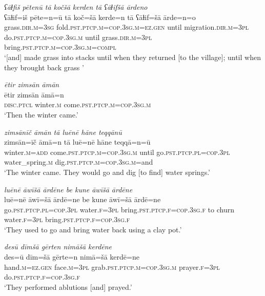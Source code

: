 \ea \label{ŽE.13}
\textit{ʕāɫfiš pētenū tā kočšā kerden tā ʕāɫifšā ārdeno} \\ 
\gll ʕāɫif=iš pēte=n=ū tā koč=šā kerde=n tā ʕāɫif=šā ārde=n=o \\ 
 grass\textsc{.dir}\textsc{.m}\textsc{=3sg} fold\textsc{.pst}\textsc{.ptcp}\textsc{.m}\textsc{=cop}\textsc{.3sg}\textsc{.m}\textsc{\textsc{=ez.gen}} until migration\textsc{.dir}\textsc{.m}\textsc{=3pl} do\textsc{.pst}\textsc{.ptcp}\textsc{.m}\textsc{=cop}\textsc{.3sg}\textsc{.m} until grass\textsc{.dir}\textsc{.m}\textsc{=3pl} bring\textsc{.pst}\textsc{.ptcp}\textsc{.m}\textsc{=cop}\textsc{.3sg}\textsc{.m}\textsc{=compl} \\ 
\glt `[and] made grass into stacks until when they returned [to the village]; until when they brought back grass '
\z 
 
\ea \label{ŽE.14}
\textit{ētir zimsān āmān} \\ 
\gll ētir zimsān āmā=n \\ 
 \textsc{disc.ptcl} winter\textsc{.m} come\textsc{.pst}\textsc{.ptcp}\textsc{.m}\textsc{=cop}\textsc{.3sg}\textsc{.m} \\ 
\glt `Then the winter came.'
\z 
 
\ea \label{ŽE.15}
\textit{zimsānīč āmān tā luēnē hāne teqqānū} \\ 
\gll zimsān=īč āmā=n tā luē=nē hāne teqqā=n=ū \\ 
 winter\textsc{.m}\textsc{=add} come\textsc{.pst}\textsc{.ptcp}\textsc{.m}\textsc{=cop}\textsc{.3sg}\textsc{.m} until go\textsc{.pst}\textsc{.ptcp}\textsc{.pl}\textsc{=cop}\textsc{.3pl} water\_spring\textsc{.m} dig\textsc{.pst}\textsc{.ptcp}\textsc{.m}\textsc{=cop}\textsc{.3sg}\textsc{.m}=and \\ 
\glt `The winter came. They would go and dig [to find] water springs.'
\z 
 
\ea \label{ŽE.16}
\textit{luēnē āwīšā ārdēne be kune āwīšā ārdēne} \\ 
\gll luē=nē āwī=šā ārdē=ne be kune āwī=šā ārdē=ne \\ 
 go\textsc{.pst}\textsc{.ptcp}\textsc{.pl}\textsc{=cop}\textsc{.3pl} water\textsc{.f}\textsc{=3pl} bring\textsc{.pst}\textsc{.ptcp}\textsc{.f}\textsc{=cop}\textsc{.3sg}\textsc{.f} to churn water\textsc{.f}\textsc{=3pl} bring\textsc{.pst}\textsc{.ptcp}\textsc{.f}\textsc{=cop}\textsc{.3sg}\textsc{.f} \\ 
\glt `They used to go and bring water back using a clay pot.'
\z 
 
\ea \label{ŽE.18}
\textit{desū dīmšā gērten nimāšā kerdēne} \\ 
\gll des=ū dīm=šā gērte=n nimā=šā kerdē=ne \\ 
 hand\textsc{.m}\textsc{\textsc{=ez.gen}} face\textsc{.m}\textsc{=3pl} grab\textsc{.pst}\textsc{.ptcp}\textsc{.m}\textsc{=cop}\textsc{.3sg}\textsc{.m} prayer\textsc{.f}\textsc{=3pl} do\textsc{.pst}\textsc{.ptcp}\textsc{.f}\textsc{=cop}\textsc{.3sg}\textsc{.f} \\ 
\glt `They performed ablutions [and] prayed.'
\z 
 
